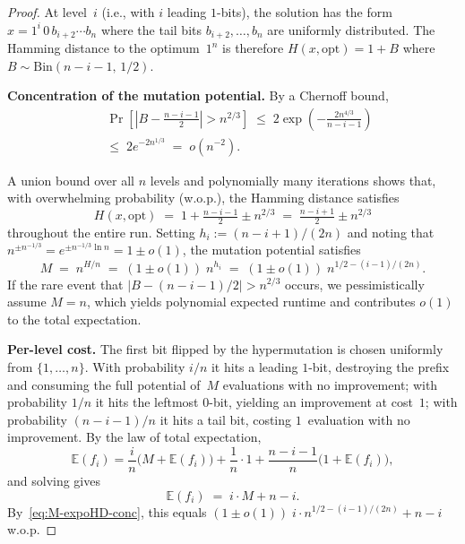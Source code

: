 \documentclass[lettersize,journal]{IEEEtran}
\newcommand{\EE}{\mathbb{E}}
\begin{document}
\begin{proof}
At level~$i$ (i.e., with $i$ leading $1$-bits), the solution has the form
$x = 1^{i}\,0\,b_{i+2}\cdots b_n$ where the tail bits $b_{i+2},\dots,b_n$
are uniformly distributed.
The Hamming distance to the optimum~$1^n$ is therefore
$H(x,\text{opt}) = 1 + B$ where $B\sim\mathrm{Bin}(n-i-1,\,1/2)$.

\medskip
\noindent\textbf{Concentration of the mutation potential.}
By a Chernoff bound,
\begin{align*}
&\Pr\!\left[\left|B - \tfrac{n-i-1}{2}\right| > n^{2/3}\right]
\;\le\; 2\exp\!\left(-\frac{2n^{4/3}}{n-i-1}\right)
\\\;&\le\; 2e^{-2n^{1/3}}
\;=\; o(n^{-2}).
\end{align*}

A union bound over all $n$ levels and polynomially many iterations shows that,
with overwhelming probability (w.o.p.), the Hamming distance satisfies
\[
H(x,\text{opt})
\;=\; 1 + \tfrac{n-i-1}{2} \pm n^{2/3}
\;=\; \tfrac{n-i+1}{2} \pm n^{2/3}
\]
throughout the entire run.
Setting $h_i := (n-i+1)/(2n)$ and noting that
$n^{\pm n^{-1/3}} = e^{\pm n^{-1/3}\ln n} = 1 \pm o(1)$,
the mutation potential satisfies
\begin{equation}\label{eq:M-expoHD-conc}
M \;=\; n^{H/n}
  \;=\; (1\pm o(1))\;n^{h_i}
  \;=\; (1\pm o(1))\;n^{1/2-(i-1)/(2n)}.
\end{equation}
If the rare event that $|B - (n-i-1)/2| > n^{2/3}$ occurs, we
pessimistically assume $M=n$, which yields polynomial expected runtime and
contributes $o(1)$ to the total expectation.

\medskip
\noindent\textbf{Per-level cost.}
The first bit flipped by the hypermutation is chosen uniformly from
$\{1,\dots,n\}$.  With probability $i/n$ it hits a leading $1$-bit,
destroying the prefix and consuming the full potential of~$M$ evaluations
with no improvement; with probability $1/n$ it hits the leftmost $0$-bit,
yielding an improvement at cost~$1$; with probability $(n-i-1)/n$ it hits
a tail bit, costing $1$~evaluation with no improvement.
By the law of total expectation,
\[
\EE(f_i)
= \frac{i}{n}\bigl(M+\EE(f_i)\bigr)
  +\frac{1}{n}\cdot 1
  +\frac{n-i-1}{n}\bigl(1+\EE(f_i)\bigr),
\]
and solving gives
\begin{equation}\label{eq:Efi-expoHD}
\EE(f_i) \;=\; i\cdot M + n - i.
\end{equation}
By~\eqref{eq:M-expoHD-conc}, this equals
$(1\pm o(1))\;i\cdot n^{1/2-(i-1)/(2n)} + n - i$ w.o.p.


\end{proof}
\end{document}
